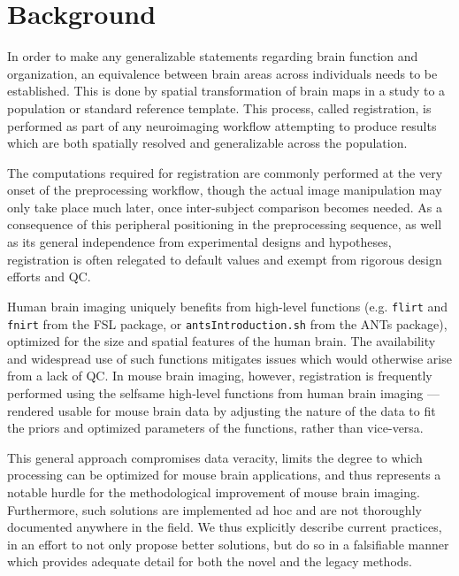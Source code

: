 \section{Background}
\label{sec:bg}

In order to make any generalizable statements regarding brain function and organization, an equivalence between brain areas across individuals needs to be established.
This is done by spatial transformation of brain maps in a study to a population or standard reference template.
This process, called registration, is performed as part of any neuroimaging workflow attempting to produce results which are both spatially resolved and generalizable across the population.

The computations required for registration are commonly performed at the very onset of the preprocessing workflow,
though the actual image manipulation may only take place much later, once inter-subject comparison becomes needed.
As a consequence of this peripheral positioning in the preprocessing sequence, as well as its general independence from experimental designs and hypotheses, registration is often relegated to default values and exempt from rigorous design efforts and QC.

Human brain imaging uniquely benefits from high-level functions (e.g. \textcolor{mg}{\texttt{flirt}} and  \textcolor{mg}{\texttt{fnirt}} from the FSL package\cite{fsl}, or \textcolor{mg}{\texttt{antsIntroduction.sh}} from the ANTs package\cite{ants}), optimized for the size and spatial features of the human brain.
The availability and widespread use of such functions mitigates issues which would otherwise arise from a lack of QC.
In mouse brain imaging, however, registration is frequently performed using the selfsame high-level functions from human brain imaging --- rendered usable for mouse brain data by adjusting the nature of the data to fit the priors and optimized parameters of the functions, rather than vice-versa.

This general approach compromises data veracity, limits the degree to which processing can be optimized for mouse brain applications, and thus represents a notable hurdle for the methodological improvement of mouse brain imaging.
Furthermore, such solutions are implemented ad hoc and are not thoroughly documented anywhere in the field.
We thus explicitly describe current practices, in an effort to not only propose better solutions, but do so in a falsifiable manner which provides adequate detail for both the novel and the legacy methods.

